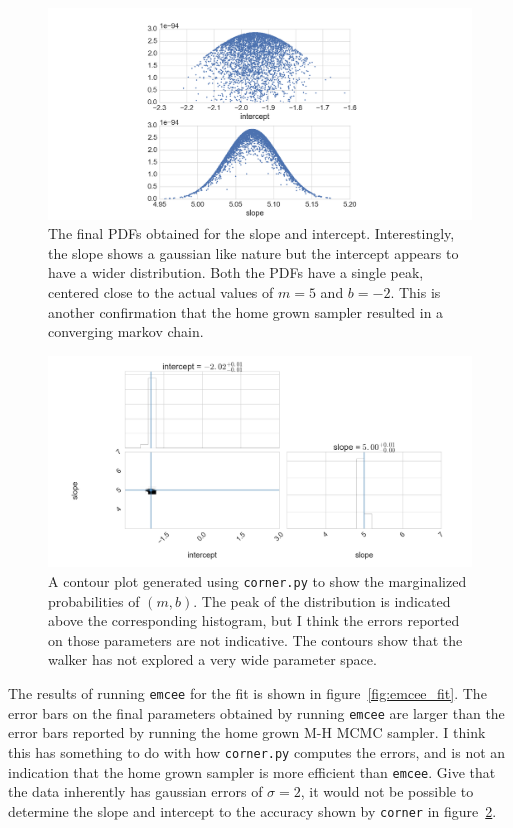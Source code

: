 \documentclass[12pt,usletter,english]{article}
\begin{document}
\begin{figure}[!h]
  \centering \includegraphics[width=13cm]{diagnostics_fit.png}
  \caption{The final PDFs obtained for the slope and
    intercept. Interestingly, the slope shows a gaussian like nature
    but the intercept appears to have a wider distribution. Both the
    PDFs have a single peak, centered close to the actual values of
    $m=5$ and $b=-2$. This is another confirmation that the home grown
    sampler resulted in a converging markov chain.
    \label{fig:checks_fit}}
\end{figure}

\begin{figure}[!h]
  \centering \includegraphics[width=13cm]{mh_fit.png}
  \caption{A contour plot generated using \texttt{corner.py} to show
    the marginalized probabilities of $(m,b)$. The peak of the
    distribution is indicated above the corresponding histogram, but I
    think the errors reported on those parameters are not
    indicative. The contours show that the walker has not explored a
    very wide parameter space.
    \label{fig:contours_fit}}
\end{figure}

The results of running \texttt{emcee} for the fit is shown in
figure~\ref{fig:emcee_fit}. The error bars on the final parameters
obtained by running \texttt{emcee} are larger than the error bars
reported by running the home grown M-H MCMC sampler. I think this has
something to do with how \texttt{corner.py} computes the errors, and
is not an indication that the home grown sampler is more efficient
than \texttt{emcee}. Give that the data inherently has gaussian errors
of $\sigma=2$, it would not be possible to determine the slope and
intercept to the accuracy shown by \texttt{corner} in
figure~\ref{fig:contours_fit}.
\end{document}
